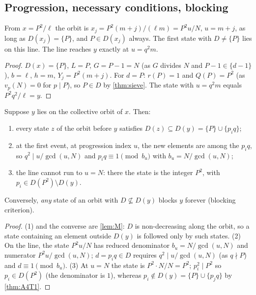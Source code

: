 \subsection{Progression, necessary conditions, blocking}
\begin{lemma}[progression]\label{lem:progression}
From $x=P^2/\ell$ the orbit is $x_j=P^2(m+j)/(\ell m)=P^2u/N$, $u=m+j$, as long as $D(x_j)=\{P\}$, and $P\in D(x_j)$ always. The first state with $D\ne\{P\}$ lies on this line. The line reaches $y$ exactly at $u=q^2m$.
\end{lemma}
\begin{proof}
$D(x)=\{P\}$, $L=P$, $G=P-1=N$ (as $G$ divides $N$ and $P-1\in\{d-1\}$), $b=\ell$, $h=m$, $Y_j=P^2(m+j)$. For $d=P$: $r(P)=1$ and $Q(P)=P^2$ (as $v_p(N)=0$ for $p\mid P$), so $P\in D$ by \cref{thm:sieve}. The state with $u=q^2m$ equals $P^2q^2/\ell=y$. \qedhere
\end{proof}
\begin{theorem}\label{thm:A4T3b}
Suppose $y$ lies on the collective orbit of $x$. Then:
\begin{enumerate}[label=(\arabic*),itemsep=1pt]
\item every state $z$ of the orbit before $y$ satisfies $D(z)\subseteq D(y)=\{P\}\cup\{p_iq\}$;
\item at the first event, at progression index $u$, the new elements are among the $p_iq$, so $q^2\mid u/\gcd(u,N)$ and $p_iq\equiv1\pmod{b_u}$ with $b_u=N/\gcd(u,N)$;
\item the line cannot run to $u=N$: there the state is the integer $P^2$, with $p_i\in D(P^2)\setminus D(y)$.
\end{enumerate}
Conversely, \emph{any} state of an orbit with $D\not\subseteq D(y)$ blocks $y$ forever (blocking criterion).
\end{theorem}
\begin{proof}
(1) and the converse are \cref{lem:M}: $D$ is non-decreasing along the orbit, so a state containing an element outside $D(y)$ is followed only by such states. (2) On the line, the state $P^2u/N$ has reduced denominator $b_u=N/\gcd(u,N)$ and numerator $P^2u/\gcd(u,N)$; $d=p_iq\in D$ requires $q^2\mid u/\gcd(u,N)$ (as $q\nmid P$) and $d\equiv1\pmod{b_u}$. (3) At $u=N$ the state is $P^2\cdot N/N=P^2$; $p_i^2\mid P^2$ so $p_i\in D(P^2)$ (the denominator is $1$), whereas $p_i\notin D(y)=\{P\}\cup\{p_jq\}$ by \cref{thm:A4T1}. \qedhere
\end{proof}


